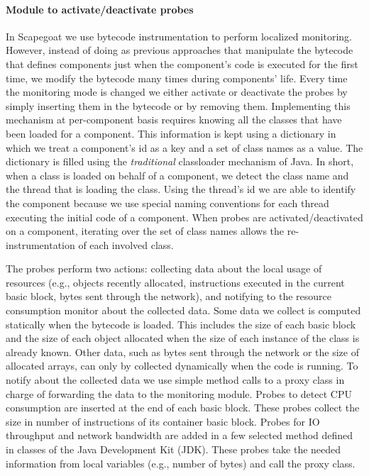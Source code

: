 \paragraph{Module to activate/deactivate probes}
In Scapegoat  we use bytecode instrumentation to perform localized monitoring.
However, instead of doing as previous approaches that manipulate the bytecode that defines components just when the component's code is executed for the first time, we modify the bytecode many times during components' life.
Every time the monitoring mode is changed we either activate or deactivate the probes by simply inserting them in the bytecode or by removing them. 
Implementing this mechanism at per-component basis requires knowing all the classes that have been loaded for a component.
This information is kept using a dictionary in which we treat a component's id as a key and a set of class names as a value.
The dictionary is filled using the \textit{traditional} classloader mechanism of Java.
In short, when a class is loaded on behalf of a component, we detect the class name and the thread that is loading the class.
Using the thread's id we are able to identify the component because we use special naming conventions for each thread executing the initial code of a component.
When probes are activated/deactivated on a component, iterating over the set of class names allows the re-instrumentation of each involved class.

The probes perform two actions: collecting data about the local usage of resources (e.g., objects recently allocated, instructions executed in the current basic block, bytes sent through the network), and notifying to the resource consumption monitor about the collected data. 
Some data we collect is computed statically when the bytecode is loaded.
This includes the size of each basic block and the size of each object allocated when the size of each instance of the class is already known.
Other data, such as bytes sent through the network or the size of allocated arrays, can only by collected dynamically when the code is running.
To notify about the collected data we use simple method calls to a proxy class in charge of forwarding the data to the monitoring module.
Probes to detect CPU consumption are inserted at the end of each basic block.
These probes collect the size in number of instructions of its container basic block.
Probes for IO throughput and network bandwidth are added in a few selected method defined in classes of the Java Development Kit (JDK).
These probes take the needed information from local variables (e.g., number of bytes) and call the proxy class. 

